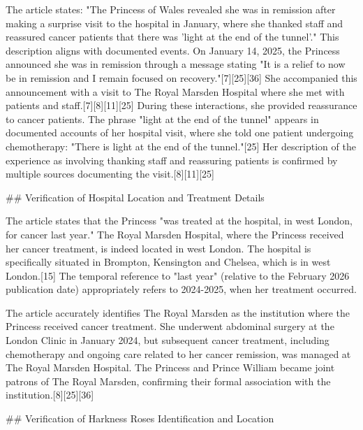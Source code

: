 \documentclass[10pt,a4paper]{article}
\begin{document}
The article states: "The Princess of Wales revealed she was in remission after making a surprise visit to the hospital in January, where she thanked staff and reassured cancer patients that there was 'light at the end of the tunnel'." This description aligns with documented events. On January 14, 2025, the Princess announced she was in remission through a message stating "It is a relief to now be in remission and I remain focused on recovery."[7][25][36] She accompanied this announcement with a visit to The Royal Marsden Hospital where she met with patients and staff.[7][8][11][25] During these interactions, she provided reassurance to cancer patients. The phrase "light at the end of the tunnel" appears in documented accounts of her hospital visit, where she told one patient undergoing chemotherapy: "There is light at the end of the tunnel."[25] Her description of the experience as involving thanking staff and reassuring patients is confirmed by multiple sources documenting the visit.[8][11][25]
\par\medskip
\#\# Verification of Hospital Location and Treatment Details
\par\medskip
The article states that the Princess "was treated at the hospital, in west London, for cancer last year." The Royal Marsden Hospital, where the Princess received her cancer treatment, is indeed located in west London. The hospital is specifically situated in Brompton, Kensington and Chelsea, which is in west London.[15] The temporal reference to "last year" (relative to the February 2026 publication date) appropriately refers to 2024-2025, when her treatment occurred.
\par\medskip
The article accurately identifies The Royal Marsden as the institution where the Princess received cancer treatment. She underwent abdominal surgery at the London Clinic in January 2024, but subsequent cancer treatment, including chemotherapy and ongoing care related to her cancer remission, was managed at The Royal Marsden Hospital. The Princess and Prince William became joint patrons of The Royal Marsden, confirming their formal association with the institution.[8][25][36]
\par\medskip
\#\# Verification of Harkness Roses Identification and Location
\par\medskip
\end{document}
